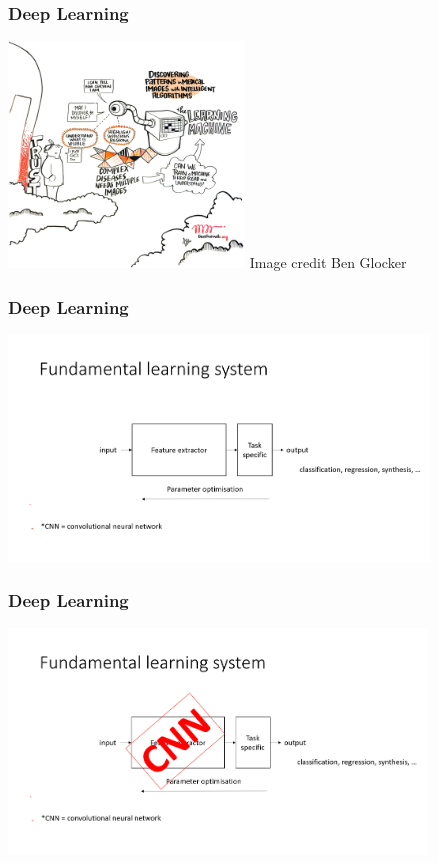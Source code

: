 \begin{frame}
    \frametitle{Deep Learning}
    \begin{center}
    \includegraphics[height=6cm]{img/AI-Medical-600px.png}
    {\tiny Image credit Ben Glocker}
    \end{center}
\end{frame}

\begin{frame}
    \frametitle{Deep Learning}
    \includegraphics[height=6cm]{img/woCNN.png}
\end{frame}

\begin{frame}
    \frametitle{Deep Learning}
    \includegraphics[height=6cm]{img/wCNN.png}
\end{frame}

